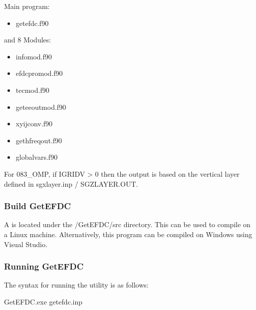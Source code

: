 \documentclass[letterpaper,10pt,english]{sphinxmanual}
\begin{document}
Main program:
\begin{itemize}
\item {} 
getefdc.f90

\end{itemize}

and 8 Modules:
\begin{itemize}
\item {} 
infomod.f90

\item {} 
efdcpromod.f90

\item {} 
tecmod.f90

\item {} 
geteeoutmod.f90

\item {} 
xyijconv.f90

\item {} 
gethfreqout.f90

\item {} 
globalvars.f90

\end{itemize}

For 083\_OMP, if  IGRIDV \textgreater{} 0 then the output is based on the vertical layer defined in sgxlayer.inp  / SGZLAYER.OUT.


\subsubsection{Build GetEFDC}
\label{\detokenize{outputfiles/getefdc:build-getefdc}}
A  is located under the /GetEFDC/src directory.  This can be used to compile on a Linux machine. Alternatively, this program can be compiled on Windows using Visual Studio.


\subsubsection{Running GetEFDC}
\label{\detokenize{outputfiles/getefdc:running-getefdc}}
The syntax for running the utility is as follows:

\begin{sphinxVerbatim}[commandchars=\\\{\}]
GetEFDC.exe getefdc.inp
\end{sphinxVerbatim}
\end{document}
